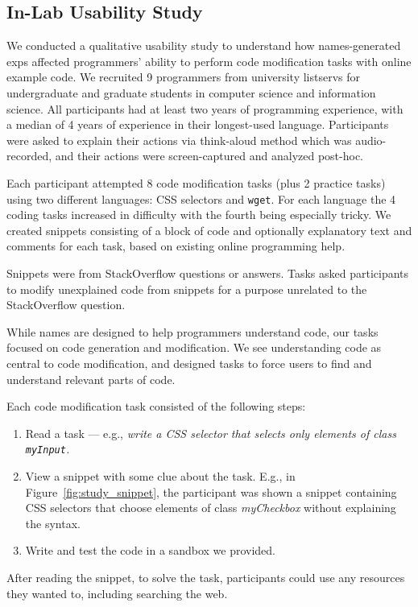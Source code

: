 \subsection{In-Lab Usability Study}

We conducted a qualitative usability study to understand how \Glspl{name}-generated \glspl{exp} affected programmers' ability to perform code modification tasks with online example code.
We recruited 9 programmers from university listservs for undergraduate and graduate students in computer science and information science.
All participants had at least two years of programming experience, with a median of 4 years of experience in their longest-used language.  Participants were asked to explain their actions via think-aloud method which was audio-recorded, and their actions were screen-captured and analyzed post-hoc. 

Each participant attempted 8 code modification tasks (plus 2 practice tasks) using two different languages: CSS selectors and \texttt{wget}.
For each language the 4 coding tasks increased in difficulty with the fourth being especially tricky.
We created snippets consisting of a block of code and optionally  explanatory text and comments for each task, based on  existing online programming help.
\begin{changes}
Snippets were from StackOverflow questions or answers.
Tasks asked participants to modify unexplained code from snippets for a purpose unrelated to the StackOverflow question.
\end{changes}
\begin{changes}
While \glspl{name} are designed to help programmers understand code, our tasks focused on code generation and modification.
We see understanding code as central to code modification, and designed tasks to force users to find and understand relevant parts of code.
\end{changes}

Each code modification task consisted of the following steps:
\begin{enumerate}
\item Read a task --- e.g., \emph{write a CSS selector that selects only elements of class \texttt{myInput}.}
\item View a snippet with some clue about the task.
E.g., in Figure~\ref{fig:study_snippet}, the participant was shown a snippet containing CSS selectors that choose elements of class \emph{myCheckbox} without explaining the syntax.
\item Write and test the code in a sandbox we provided.
\end{enumerate}
After reading the snippet, to solve the task, participants could use any resources they wanted to, including searching the web.

